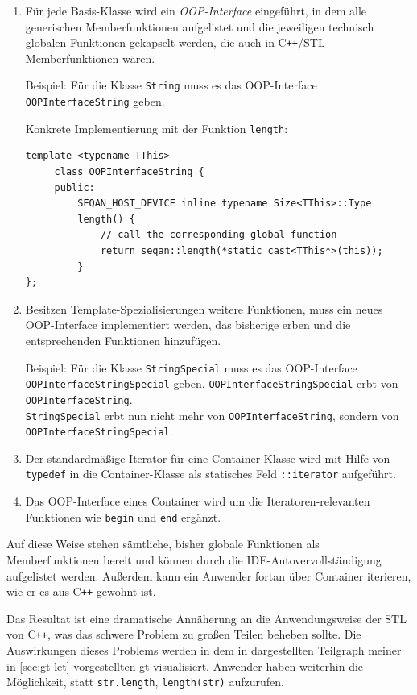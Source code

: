 \begin{enumerate}
  \item Für jede Basis-Klasse wird ein \textit{OOP-Interface} eingeführt, in dem alle generischen Memberfunktionen aufgelistet und die jeweiligen technisch globalen Funktionen gekapselt werden, die auch in C\texttt{++}/STL Memberfunktionen wären.
  
  Beispiel: Für die Klasse \texttt{String} muss es das OOP-Interface \texttt{OOPInterfaceString} geben.
  
  Konkrete Implementierung mit der Funktion \texttt{length}:
  \begin{verbatim}
template <typename TThis>
     class OOPInterfaceString {
     public:
         SEQAN_HOST_DEVICE inline typename Size<TThis>::Type
         length() {
             // call the corresponding global function
             return seqan::length(*static_cast<TThis*>(this));
         }
};  
  \end{verbatim}

  
  \item Besitzen Template-Spezialisierungen weitere Funktionen, muss ein neues OOP-Interface implementiert werden, das bisherige erben und die entsprechenden Funktionen hinzufügen.
  
  Beispiel: Für die Klasse \texttt{StringSpecial} muss es das OOP-Interface \texttt{OOPInterfaceStringSpecial} geben. \texttt{OOPInterfaceStringSpecial} erbt von \texttt{OOPInterfaceString}.\\
  \texttt{StringSpecial} erbt nun nicht mehr von \texttt{OOPInterfaceString}, sondern von \texttt{OOPInterfaceStringSpecial}.
  
  \item Der standardmäßige Iterator für eine Container-Klasse wird mit Hilfe von \texttt{typedef} in die Container-Klasse als statisches Feld \texttt{::iterator} aufgeführt.
  \item Das OOP-Interface eines Container wird um die Iteratoren-relevanten Funktionen wie \texttt{begin} und \texttt{end} ergänzt.
\end{enumerate}

Auf diese Weise stehen sämtliche, bisher globale Funktionen als Memberfunktionen bereit und können durch die IDE-Autovervollständigung aufgelistet werden. Außerdem kann ein Anwender fortan über Container iterieren, wie er es aus C\texttt{++} gewohnt ist.

Das Resultat ist eine dramatische Annäherung an die Anwendungsweise der STL von C\texttt{++}, was das schwere Problem  zu großen Teilen beheben sollte. Die Auswirkungen dieses Problems werden in dem in  dargestellten Teilgraph meiner in \ref{sec:gt-let} vorgestellten \gls{gt} visualisiert. Anwender haben weiterhin die Möglichkeit, statt \texttt{str.length}, \texttt{length(str)} aufzurufen.

